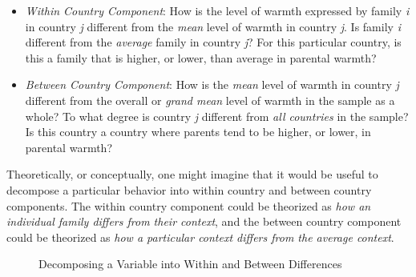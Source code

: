 \documentclass[
  letterpaper,
  DIV=11,
  numbers=noendperiod]{scrreprt}
\providecommand{\tightlist}{%
  \setlength{\itemsep}{0pt}\setlength{\parskip}{0pt}}\usepackage{longtable,booktabs,array}
\begin{document}
\begin{itemize}
\tightlist
\item
  \emph{Within Country Component}: How is the level of warmth expressed
  by family \emph{i} in country \emph{j} different from the \emph{mean}
  level of warmth in country \emph{j}. Is family \emph{i} different from
  the \emph{average} family in country \emph{j}? For this particular
  country, is this a family that is higher, or lower, than average in
  parental warmth?
\item
  \emph{Between Country Component}: How is the \emph{mean} level of
  warmth in country \emph{j} different from the overall or \emph{grand
  mean} level of warmth in the sample as a whole? To what degree is
  country \emph{j} different from \emph{all countries} in the sample? Is
  this country a country where parents tend to be higher, or lower, in
  parental warmth?
\end{itemize}

Theoretically, or conceptually, one might imagine that it would be
useful to decompose a particular behavior into within country and
between country components. The within country component could be
theorized as \emph{how an individual family differs from their context},
and the between country component could be theorized as \emph{how a
particular context differs from the average context}.

\begin{figure}


\caption{\label{fig-withinbetween}Decomposing a Variable into Within and
Between Differences}

\end{figure}%
\end{document}
